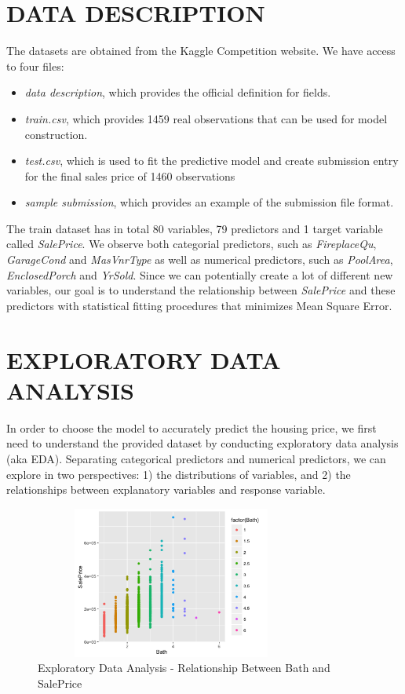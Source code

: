 \documentclass[letterpaper, 10 pt, conference]{ieeeconf}\usepackage[]{graphicx}\usepackage[]{color}
\begin{document}
\section{DATA DESCRIPTION}
The datasets are obtained from the Kaggle Competition website. We have access to four files: 
\begin{itemize}
\item \textit{data description}, which provides the official definition for fields.
\item \textit{train.csv}, which provides 1459 real observations that can be used for model construction.
\item \textit{test.csv}, which is used to fit the predictive model and create submission entry for the final sales price of 1460 observations 
\item \textit{sample submission}, which provides an example of the submission file format.
\end{itemize}

The train dataset has in total 80 variables, 79 predictors and 1 target variable called \textit{SalePrice}. We observe both categorial predictors, such as \textit{FireplaceQu}, \textit{GarageCond} and \textit{MasVnrType} as well as numerical predictors, such as \textit{PoolArea}, \textit{EnclosedPorch} and \textit{YrSold}. Since we can potentially create a lot of different new variables, our goal is to understand the relationship between \textit{SalePrice} and these predictors with statistical fitting procedures that minimizes Mean Square Error.

\section{EXPLORATORY DATA ANALYSIS}
In order to choose the model to accurately predict the housing price, we first need to understand the provided dataset by conducting exploratory data analysis (aka EDA). Separating categorical predictors and numerical predictors, we can explore in two perspectives: 1) the distributions of variables, and 2) the relationships between explanatory variables and response variable. 
   \begin{figure}[thpb]
      \centering
      \includegraphics[width =  9cm, height = 5cm]{../images/eda-bath-vs-sale.png}
      \caption{Exploratory Data Analysis - Relationship Between Bath and SalePrice}
      \label{figurelabel}
   \end{figure}
   
\end{document}
